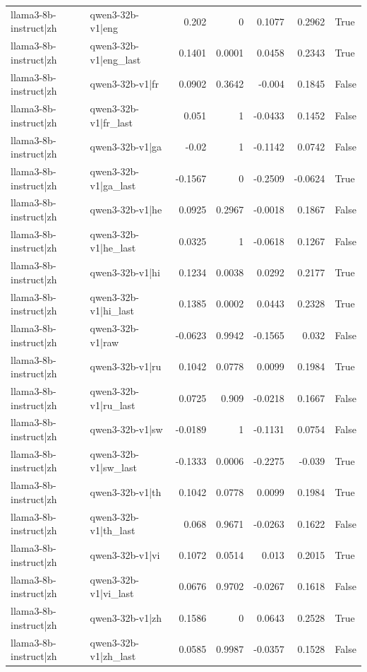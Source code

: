 \begin{table}
\begin{tabular}{l l r r r r l}
llama3-8b-instruct|zh & qwen3-32b-v1|eng & 0.202 & 0 & 0.1077 & 0.2962 & True \\
llama3-8b-instruct|zh & qwen3-32b-v1|eng_last & 0.1401 & 0.0001 & 0.0458 & 0.2343 & True \\
llama3-8b-instruct|zh & qwen3-32b-v1|fr & 0.0902 & 0.3642 & -0.004 & 0.1845 & False \\
llama3-8b-instruct|zh & qwen3-32b-v1|fr_last & 0.051 & 1 & -0.0433 & 0.1452 & False \\
llama3-8b-instruct|zh & qwen3-32b-v1|ga & -0.02 & 1 & -0.1142 & 0.0742 & False \\
llama3-8b-instruct|zh & qwen3-32b-v1|ga_last & -0.1567 & 0 & -0.2509 & -0.0624 & True \\
llama3-8b-instruct|zh & qwen3-32b-v1|he & 0.0925 & 0.2967 & -0.0018 & 0.1867 & False \\
llama3-8b-instruct|zh & qwen3-32b-v1|he_last & 0.0325 & 1 & -0.0618 & 0.1267 & False \\
llama3-8b-instruct|zh & qwen3-32b-v1|hi & 0.1234 & 0.0038 & 0.0292 & 0.2177 & True \\
llama3-8b-instruct|zh & qwen3-32b-v1|hi_last & 0.1385 & 0.0002 & 0.0443 & 0.2328 & True \\
llama3-8b-instruct|zh & qwen3-32b-v1|raw & -0.0623 & 0.9942 & -0.1565 & 0.032 & False \\
llama3-8b-instruct|zh & qwen3-32b-v1|ru & 0.1042 & 0.0778 & 0.0099 & 0.1984 & True \\
llama3-8b-instruct|zh & qwen3-32b-v1|ru_last & 0.0725 & 0.909 & -0.0218 & 0.1667 & False \\
llama3-8b-instruct|zh & qwen3-32b-v1|sw & -0.0189 & 1 & -0.1131 & 0.0754 & False \\
llama3-8b-instruct|zh & qwen3-32b-v1|sw_last & -0.1333 & 0.0006 & -0.2275 & -0.039 & True \\
llama3-8b-instruct|zh & qwen3-32b-v1|th & 0.1042 & 0.0778 & 0.0099 & 0.1984 & True \\
llama3-8b-instruct|zh & qwen3-32b-v1|th_last & 0.068 & 0.9671 & -0.0263 & 0.1622 & False \\
llama3-8b-instruct|zh & qwen3-32b-v1|vi & 0.1072 & 0.0514 & 0.013 & 0.2015 & True \\
llama3-8b-instruct|zh & qwen3-32b-v1|vi_last & 0.0676 & 0.9702 & -0.0267 & 0.1618 & False \\
llama3-8b-instruct|zh & qwen3-32b-v1|zh & 0.1586 & 0 & 0.0643 & 0.2528 & True \\
llama3-8b-instruct|zh & qwen3-32b-v1|zh_last & 0.0585 & 0.9987 & -0.0357 & 0.1528 & False \\

\end{tabular}
\end{table}
